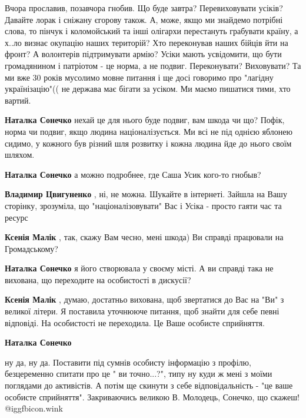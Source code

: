 \begin{itemize}
\begin{itemize}
\end{itemize} %


Вчора прославив, позавчора гнобив. Що буде завтра? Перевиховувати усіків?
Давайте лорак і сніжану єгорову також. А, може, якщо ми знайдемо потрібні
слова, то пінчук і коломойський та інші олігархи перестануть грабувати країну,
а х..ло визнає окупацію наших територій? Хто переконував наших бійців йти на
фронт? А волонтерів підтримувати армію? Усіки мають усвідомити, що бути
громадянином і патріотом - це норма, а не подвиг. Переконувати? Виховувати? Та
ми вже 30 років мусолимо мовне питання і ще досі говоримо про "лагідну
українізацію"(( не держава має бігати за усіком. Ми маємо пишатися тими, хто
вартий.

\begin{itemize} %
\textbf{Наталка Сонечко} нехай це для нього буде подвиг, вам шкода чи що? Пофік, норма чи подвиг, якщо людина націоналізується. Ми всі не під однією яблонею сидимо, у кожного був різний шля розвитку і кожна людина йде до нього своїм шляхом.

\textbf{Наталка Сонечко} а можно подробнее, где Саша Усик кого-то гнобыв?

\textbf{Владимир Цвигуненко} , ні, не можна. Шукайте в інтернеті. Зайшла на Вашу сторінку, зрозуміла, що "націоналізовувати" Вас і Усіка - просто гаяти час та ресурс

\textbf{Ксенія Малік} , так, скажу Вам чесно, мені шкода) Ви справді працювали на Громадському?

\textbf{Наталка Сонечко} я його створювала у своєму місті. А ви справді така не вихована, що переходите на особистості в дискусії?

\textbf{Ксенія Малік} , думаю, достатньо вихована, щоб звертатися до Вас на "Ви" з великої літери. Я поставила уточнююче питання, щоб знайти для себе певні відповіді. На особистості не переходила. Це Ваше особисте сприйняття.

\textbf{Наталка Сонечко} 

ну да, ну да. Поставити під сумнів особисту інформацію з профілю, безцеременно
спитати про це " ви точно...?", типу ну куди ж мені з моїми поглядами до
активістів. А потім ще скинути з себе відповідальність - "це ваше особисте
сприйняття". Закриваючись великою В. Молодець, Сонечко, що скажеш!  @igg{fbicon.wink} 


\end{itemize}
\end{itemize}
